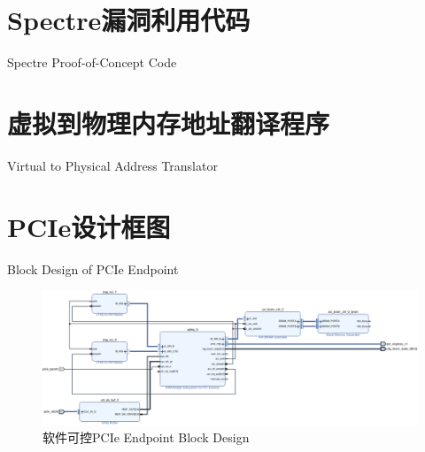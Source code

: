 \documentclass[degree=undergraduate,bibstyle=numerical,font=empty]{xmuthesis}
\begin{document}
\maketitle


\xmutableofcontents %




\nocite{*} 

\appendix
\chapter{Spectre漏洞利用代码}{Spectre Proof-of-Concept Code} \label{app:spectre-code}


\chapter{虚拟到物理内存地址翻译程序}{Virtual to Physical Address Translator} \label{app:v2p}


\chapter{PCIe设计框图}{Block Design of PCIe Endpoint} \label{app:pcie-ep}
\begin{figure}
	\centering
	\includegraphics[width=\textwidth]{figs/pcie-ep.pdf}
	\caption{软件可控PCIe Endpoint Block Design}
\end{figure}
\end{document}
